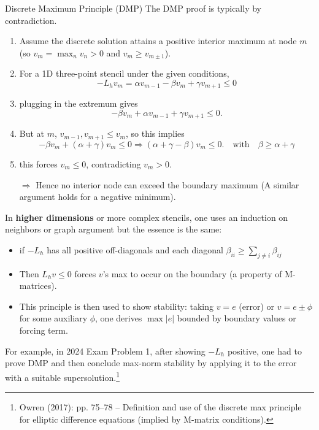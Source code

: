 \documentclass[a4paper,11pt]{report}
\begin{document}
\begin{outline}{Discrete Maximum Principle (DMP)}{}
    The DMP proof is typically by contradiction.
    \begin{enumerate}
        \item Assume the discrete solution attains a positive interior maximum at node $m$ (so $v_m = \max_n v_n > 0$ and $v_m \ge v_{m\pm1}$).
        \item For a 1D three-point stencil under the given conditions,
              $$
                  -L_h v_m = \alpha v_{m-1} - \beta v_m + \gamma v_{m+1} \le 0
              $$
        \item plugging in the extremum gives
              $$
                  -\beta v_m + \alpha v_{m-1} + \gamma v_{m+1} \le 0.
              $$
        \item But at $m$, $v_{m-1},v_{m+1}\le v_m$, so this implies
              $$
                  -\beta v_m + (\alpha+\gamma) v_m \le 0 \Rightarrow (\alpha+\gamma - \beta)v_m \le 0. \quad \text{with} \quad \beta \ge \alpha+\gamma
              $$
        \item this forces $v_m \le 0$, contradicting $v_m>0$.
        \item[$\Rightarrow$] Hence no interior node can exceed the boundary maximum (A similar argument holds for a negative minimum).
    \end{enumerate}
    \medskip
    In \textbf{higher dimensions} or more complex stencils, one uses an induction on neighbors or graph argument but the essence is the same:
    \begin{itemize}
        \item if $-L_h$ has all positive off-diagonals and each diagonal $\beta_{ii} \ge \sum_{j\neq i}\beta_{ij}$
        \item Then $L_h v \le 0$ forces $v$'s max to occur on the boundary (a property of M-matrices).
        \item This principle is then used to show stability: taking $v = e$ (error) or $v = e \pm \phi$ for some auxiliary $\phi$, one derives $\max |e|$ bounded by boundary values or forcing term.
    \end{itemize}
    \medskip
    For example, in 2024 Exam Problem 1, after showing $-L_h$ positive, one had to prove DMP and then conclude max-norm stability by applying it to the error with a suitable supersolution.\footnote{Owren (2017): pp. 75--78 -- Definition and use of the discrete max principle for elliptic difference equations (implied by M-matrix conditions).}
\end{outline}
\end{document}
